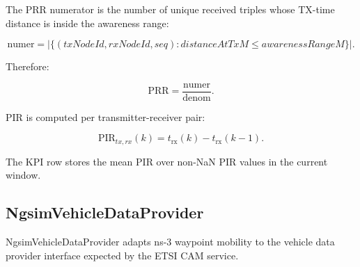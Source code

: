 \documentclass[11pt]{article}
\DeclareRobustCommand{\code}[1]{\texttt{\detokenize{#1}}}
\def\code#1{#1}%
\begin{document}
The PRR numerator is the number of unique received triples whose TX-time
distance is inside the awareness range:

\[
\mathrm{numer} =
\left|\{(txNodeId,rxNodeId,seq): distanceAtTxM \leq awarenessRangeM\}\right|.
\]

Therefore:

\[
\mathrm{PRR} = \frac{\mathrm{numer}}{\mathrm{denom}}.
\]

PIR is computed per transmitter-receiver pair:

\[
\mathrm{PIR}_{tx,rx}(k) = t_{\mathrm{rx}}(k) - t_{\mathrm{rx}}(k-1).
\]

The KPI row stores the mean PIR over non-NaN PIR values in the current window.

\subsection{\code{NgsimVehicleDataProvider}}

\code{NgsimVehicleDataProvider} adapts ns-3 waypoint mobility to the vehicle data
provider interface expected by the ETSI CAM service.
\end{document}
